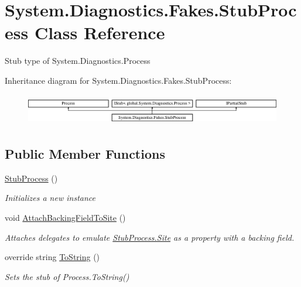 \hypertarget{class_system_1_1_diagnostics_1_1_fakes_1_1_stub_process}{\section{System.\-Diagnostics.\-Fakes.\-Stub\-Process Class Reference}
\label{class_system_1_1_diagnostics_1_1_fakes_1_1_stub_process}
}


Stub type of System.\-Diagnostics.\-Process 


Inheritance diagram for System.\-Diagnostics.\-Fakes.\-Stub\-Process\-:\begin{figure}[H]
\begin{center}
\leavevmode
\includegraphics[height=1.387856cm]{class_system_1_1_diagnostics_1_1_fakes_1_1_stub_process}
\end{center}
\end{figure}
\subsection*{Public Member Functions}
\begin{DoxyCompactItemize}
\item 
\hyperlink{class_system_1_1_diagnostics_1_1_fakes_1_1_stub_process_a338b9fc539ab4d611c9c12fc4194c81a}{Stub\-Process} ()
\begin{DoxyCompactList}\small\item\em Initializes a new instance\end{DoxyCompactList}\item 
void \hyperlink{class_system_1_1_diagnostics_1_1_fakes_1_1_stub_process_aaef998c58ff855608e22c5f1e85faa28}{Attach\-Backing\-Field\-To\-Site} ()
\begin{DoxyCompactList}\small\item\em Attaches delegates to emulate \hyperlink{class_system_1_1_diagnostics_1_1_fakes_1_1_stub_process_af0baff375528a9d5d9cfe92807743bc7}{Stub\-Process.\-Site} as a property with a backing field.\end{DoxyCompactList}\item 
override string \hyperlink{class_system_1_1_diagnostics_1_1_fakes_1_1_stub_process_a6b60a92bd45975c4bda538466bfd8f7a}{To\-String} ()
\begin{DoxyCompactList}\small\item\em Sets the stub of Process.\-To\-String()\end{DoxyCompactList}\end{DoxyCompactItemize}

